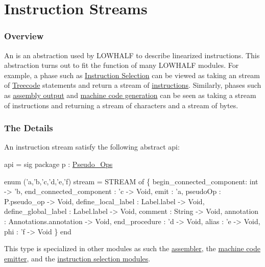 \section{Instruction Streams}

\subsubsection{Overview}
An 
is an abstraction used by LOWHALF to describe linearized instructions.
This abstraction turns out to fit the function of
many LOWHALF modules.  For example,
a phase such as \href{instrsel.html}{Instruction Selection} 
can be viewed as taking an stream of 
\href{treecode.html}{Treecode} statements and return a
stream of \href{instructions.html}{instructions}.  Similarly,
phases such as \href{asm.html}{assembly output} and
\href{mc.html}{machine code generation} can be seen 
as taking a stream of instructions and 
returning a stream of characters and a stream of bytes.

\subsubsection{The Details}
An instruction stream satisfy the following abstract api:
\begin{SML}
api  =
sig
   package p : \href{pseudo-ops.html}{Pseudo_Ops}

   enum ('a,'b,'c,'d,'e,'f) stream =
      STREAM of
      \{ begin_connected_component: int -> 'b,  
        end_connected_component  : 'c -> Void, 
        emit        : 'a,        
        pseudoOp    : P.pseudo_op -> Void,
        define_local_label : Label.label -> Void,
        define_global_label  : Label.label -> Void,
        comment     : String -> Void,    
        annotation  : Annotations.annotation -> Void,
        end_procedure   : 'd -> Void,
        alias       : 'e -> Void, 
        phi         : 'f -> Void  
      \}
end
\end{SML}
This type is specialized in other modules as such the
\href{asm.html}{assembler}, the \href{mc.html}{machine code emitter},
and the \href{instrsel.html}{instruction selection modules}.
